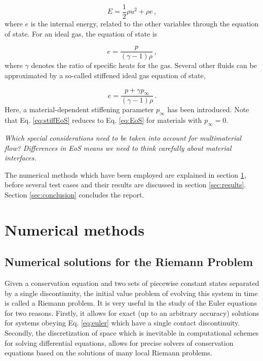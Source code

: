 \documentclass[final,3p,twocolumn]{elsarticle}
\begin{document}
\begin{equation}
    E = \frac{1}{2} \rho u^2 + \rho e \,,
    \label{eq:energy}
\end{equation}
%
where $e$ is the internal energy, related to the other variables through the
equation of state. For an ideal gas, the equation of state is 

\begin{equation}
     e = \frac{p}{(\gamma-1)\rho} \,,
     \label{eq:EoS}
 \end{equation}
%
where $\gamma$ denotes the ratio of specific heats for the gas. Several other
fluids can be approximated by a so-called stiffened ideal gas equation of
state, 

\begin{equation}
    e = \frac{p+\gamma p_{\infty}}{(\gamma-1)\rho} \,.
    \label{eq:stiffEoS}
\end{equation}
%
Here, a material-dependent stiffening parameter $p_{\infty}$ has been
introduced. Note that Eq. \eqref{eq:stiffEoS} reduces to Eq. \eqref{eq:EoS} for
materials with $p_{\infty}=0$. 

\emph{Which special considerations need to be taken into account for
multimaterial flow? Differences in EoS means we need to think carefully about
material interfaces.}

The numerical methods which have been employed are explained in section
\ref{sec:numerical}, before several test cases and their results are discussed
in section \ref{sec:results}. Section \ref{sec:conclusion} concludes the
report.

\section{Numerical methods}
\label{sec:numerical}

\subsection{Numerical solutions for the Riemann Problem}
\label{subsec:riemann}

Given a conservation equation and two sets of piecewise constant states
separated by a single discontinuity, the initial value problem of evolving this
system in time is called a Riemann problem. It is very useful in the study of
the Euler equations for two reasons. Firstly, it allows for exact (up to an
arbitrary accuracy) solutions for systems obeying Eq.  \eqref{eq:euler} which
have a single contact discontinuity. Secondly, the discretization of space
which is inevitable in computational schemes for solving differential
equations, allows for precise solvers of conservation equations based on the
solutions of many local Riemann problems. 
\end{document}
